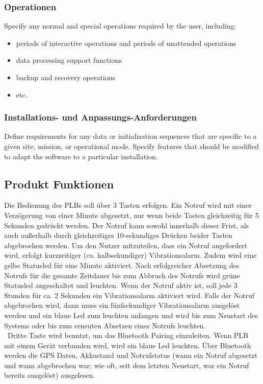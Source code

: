 \subsubsection{Operationen}
Specify any normal and special operations required by the user, including:
\begin{itemize}
	\item periods of interactive operations and periods of unattended operations
	\item data processing support functions
	\item backup and recovery operations
	\item etc.
\end{itemize}

\subsubsection{Installations- und Anpassungs-Anforderungen}
Define requirements for any data or initialization sequences that are specific to a given site, mission, or operational mode. Specify features that should be modified to adapt the software to a particular installation.

\subsection{Produkt Funktionen}
Die Bedienung des PLBs soll über 3 Tasten erfolgen. Ein Notruf wird mit einer Verzögerung von einer Minute abgesetzt, nur wenn beide Tasten gleichzeitig für 5 Sekunden gedrückt werden. Der Notruf kann sowohl innerhalb dieser Frist, als auch außerhalb durch gleichzeitiges 10-sekundiges Drücken beider Tasten abgebrochen werden. Um den Nutzer mitzuteilen, dass ein Notruf angefordert wird, erfolgt kurzzeitiger (ca. halbsekundiger) Vibrationsalarm. Zudem wird eine gelbe Statusled für eine Minute aktiviert. Nach erfolgreicher Absetzung des Notrufs für die gesamte Zeitdauer bis zum Abbruch des Notrufs wird grüne Statusled angeschaltet und leuchten. Wenn der Notruf aktiv ist, soll jede 3 Stunden für ca. 2 Sekunden ein Vibrationsalarm aktiviert wird. Falls der Notruf abgebrochen wird, dann muss ein fünfsekundiger Vibrationsalarm ausgelöst werden und ein blaue Led zum leuchten anfangen und wird bis zum Neustart des Systems oder bis zum erneuten Absetzen eines Notrufs leuchten.\\\
Dritte Taste wird benutzt, um das Bluetooth Pairing einzuleiten. Wenn PLB mit einem Gerät verbunden wird, wird ein blaue Led leuchten. Über Bluetooth werden die GPS Daten, Akkustand und Notrufstatus (wann ein Notruf abgesetzt und wann abgebrochen war; wie oft, seit dem letzten Neustart, war ein Notruf bereits ausgelöst) ausgelesen.
